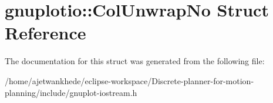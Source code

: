 \hypertarget{structgnuplotio_1_1ColUnwrapNo}{}\section{gnuplotio\+:\+:Col\+Unwrap\+No Struct Reference}
\label{structgnuplotio_1_1ColUnwrapNo}


The documentation for this struct was generated from the following file\+:\begin{DoxyCompactItemize}
\item 
/home/ajetwankhede/eclipse-\/workspace/\+Discrete-\/planner-\/for-\/motion-\/planning/include/gnuplot-\/iostream.\+h\end{DoxyCompactItemize}
